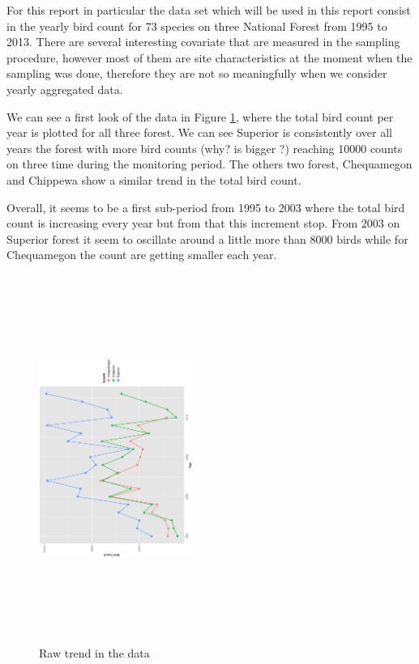 \documentclass{article}
\begin{document}
For this report in particular the data set which will be used in this report consist in the yearly bird count for 73 species on three National Forest from 1995 to 2013. There are several interesting covariate that are measured in the sampling procedure, however most of them are site characteristics at the moment when the sampling was done, therefore they are not so meaningfully when we consider yearly aggregated data.  

We can see a first look of the data in Figure \ref{figtr}, where the total bird count per year is plotted for all three forest. We can see Superior is consistently over all years the forest with more bird counts (why? is bigger ?) reaching 10000 counts on three time during the monitoring period. The others two forest, Chequamegon and Chippewa show a similar trend in the total bird count. 

Overall, it seems to be a first sub-period from 1995 to 2003 where the total bird count is increasing every year but from that this increment stop. From 2003 on Superior forest it seem to oscillate around a little more than 8000 birds while for Chequamegon the count are getting smaller each year. 

\begin{figure}[h!]
\centering
\includegraphics[height=12cm,width=5cm, angle=-90]{rawtrend.ps}
\caption{Raw trend in the data \label{figtr} }
\end{figure}
\end{document}
